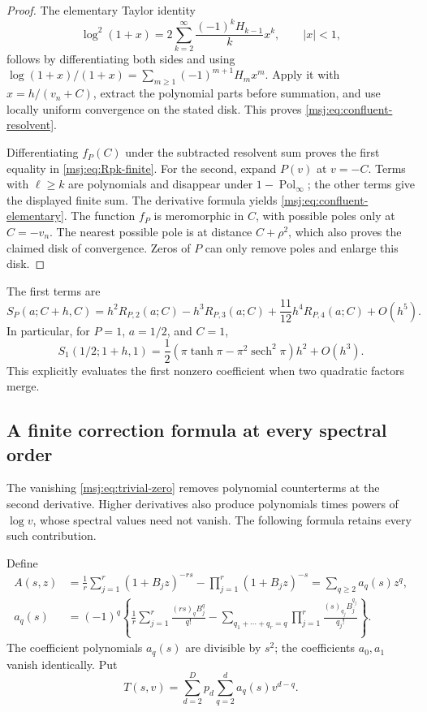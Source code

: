 \begin{proof}
The elementary Taylor identity
\[
 \log^2(1+x)=2\sum_{k=2}^{\infty}\frac{(-1)^kH_{k-1}}{k}x^k,
 \qquad |x|<1,
\]
follows by differentiating both sides and using
$\log(1+x)/(1+x)=\sum_{m\ge1}(-1)^{m+1}H_mx^m$.
Apply it with $x=h/(v_n+C)$, extract the polynomial parts before
summation, and use locally uniform convergence on the stated disk.
This proves \eqref{msj:eq:confluent-resolvent}.

Differentiating $f_P(C)$ under the subtracted resolvent sum proves the
first equality in \eqref{msj:eq:Rpk-finite}. For the second, expand
$P(v)$ at $v=-C$. Terms with $\ell\ge k$ are polynomials and disappear
under $1-\operatorname{Pol}_{\infty}$; the other terms give the displayed
finite sum. The derivative formula yields
\eqref{msj:eq:confluent-elementary}. The function $f_P$ is meromorphic
in $C$, with possible poles only at $C=-v_n$. The nearest possible pole
is at distance $C+\rho^2$, which also proves the claimed disk of
convergence. Zeros of $P$ can only remove poles and enlarge this disk.
\end{proof}

The first terms are
\[
 S_P(a;C+h,C)=h^2R_{P,2}(a;C)-h^3R_{P,3}(a;C)
                   +\frac{11}{12}h^4R_{P,4}(a;C)+O(h^5).
\]
In particular, for $P=1$, $a=1/2$, and $C=1$,
\begin{equation}
 S_1(1/2;1+h,1)
 =\frac12\left(\pi\tanh\pi-\pi^2\operatorname{sech}^2\pi\right)h^2
                                                    +O(h^3).
 \label{msj:eq:confluent-example}
\end{equation}
This explicitly evaluates the first nonzero coefficient when two
quadratic factors merge.

\subsection{A finite correction formula at every spectral order}

The vanishing \eqref{msj:eq:trivial-zero} removes polynomial
counterterms at the second derivative. Higher derivatives also produce
polynomials times powers of $\log v$, whose spectral values need not
vanish. The following formula retains every such contribution.

Define
\begin{align}
 A(s,z)&=\frac1r\sum_{j=1}^r(1+B_jz)^{-rs}
                         -\prod_{j=1}^r(1+B_jz)^{-s}
          =\sum_{q\ge2}a_q(s)z^q,
 \label{msj:eq:A}\\
 a_q(s)&=(-1)^q\left\{
  \frac1r\sum_{j=1}^r\frac{(rs)_qB_j^q}{q!}
  -\sum_{q_1+\cdots+q_r=q}\prod_{j=1}^r
                      \frac{(s)_{q_j}B_j^{q_j}}{q_j!}\right\}.
 \label{msj:eq:aq}
\end{align}
The coefficient polynomials $a_q(s)$ are divisible by $s^2$; the
coefficients $a_0,a_1$ vanish identically. Put
\begin{equation}
 T(s,v)=\sum_{d=2}^{D}p_d\sum_{q=2}^{d}a_q(s)v^{d-q}.
 \label{msj:eq:T-spectral}
\end{equation}

